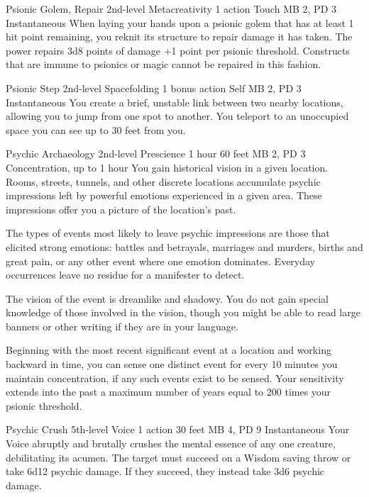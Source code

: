 \DndPowerHeader%
  {Psionic Golem, Repair}
  {2nd-level Metacreativity}
  {1 action}
  {Touch}
  {MB 2, PD 3}
  {Instantaneous}
  When laying your hands upon a psionic golem
  that has at least 1 hit point remaining,
  you reknit its structure to repair damage it has taken.
  The power repairs 3d8 points of damage
  +1 point per psionic threshold.
  Constructs that are immune to psionics or magic
  cannot be repaired in this fashion.

\DndPowerHeader%
  {Psionic Step}
  {2nd-level Spacefolding}
  {1 bonus action}
  {Self}
  {MB 2, PD 3}
  {Instantaneous}
You create a brief, unstable link between two nearby locations,
allowing you to jump from one spot to another.
You teleport to an unoccupied space you can see
up to 30 feet from you.

\DndPowerHeader%
  {Psychic Archaeology}
  {2nd-level Prescience}
  {1 hour}
  {60 feet}
  {MB 2, PD 3}
  {Concentration, up to 1 hour}
  You gain historical vision in a given location.
  Rooms, streets, tunnels, and other discrete locations
  accumulate psychic impressions left by powerful emotions
  experienced in a given area.
  These impressions offer you a picture of the location's past.

  The types of events most likely to leave
  psychic impressions are those that elicited strong emotions:
  battles and betrayals,
  marriages and murders,
  births and great pain,
  or any other event where one emotion dominates.
  Everyday occurrences leave no residue for a manifester to detect.
  
  The vision of the event is dreamlike and shadowy.
  You do not gain special knowledge of those involved in the vision,
  though you might be able to read large banners
  or other writing if they are in your language.
  
  Beginning with the most recent significant event
  at a location and working backward in time,
  you can sense one distinct event for every 10 minutes
  you maintain concentration,
  if any such events exist to be sensed.
  Your sensitivity extends into the past
  a maximum number of years equal to
  200 times your psionic threshold.

\DndPowerHeader%
  {Psychic Crush}
  {5th-level Voice}
  {1 action}
  {30 feet}
  {MB 4, PD 9}
  {Instantaneous}
Your Voice abruptly and brutally crushes the mental essence
of any one creature, debilitating its acumen.
The target must succeed on a Wisdom saving throw
or take 6d12 psychic damage.
If they succeed, they instead take 3d6 psychic damage.

